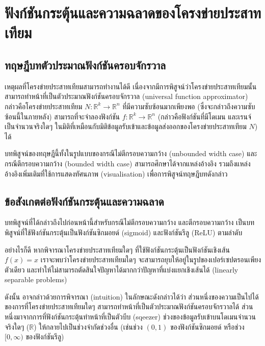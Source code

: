 \section{ฟังก์ชันกระตุ้นและความฉลาดของโครงข่ายประสาทเทียม}
\subsection{ทฤษฎีบทตัวประมาณฟังก์ชันครอบจักรวาล}
เหตุผลที่โครงข่ายประสาทเทียมสามารถทำงานได้ดี เนื่องจากมีการพิสูจน์ว่าโครงข่ายประสาทเทียมนั้นสามารถทำหน้าที่เป็นตัวประมาณฟังก์ชันครอบจักรวาล \cite{hornik_1991} (universal function approximator) กล่าวคือโครงข่ายประสาทเทียม $N: \mathbb{R} ^k \rightarrow \mathbb{R} ^n$ ที่มีความซับซ้อนมากเพียงพอ (ซึ่งจะกล่าวถึงความซับซ้อนนี้ในภายหลัง) สามารถที่จะจำลองฟังก์ชัน $f: \mathbb{R}^k \rightarrow \mathbb{R}^n$ (กล่าวคือฟังก์ชันที่มีโดเมน และเรนจ์ เป็นจำนวนจริงใดๆ ในมิติที่เหมือนกับมิติข้อมูลรับเข้าและข้อมูลส่งออกของโครงข่ายประสาทเทียม $N$) ได้ \cite{Cybenko1989} \cite{Leshno1993} \cite{1910.03344}

บทพิสูจน์ของทฤษฎีนี้ทั้งในรูปแบบของกรณีไม่ตีกรอบความกว้าง (unbounded width case) และกรณีตีกรอบความกว้าง (bounded width case) สามารถศึกษาได้จากแหล่งอ้างอิง รวมถึงแหล่งอ้างอิงเพิ่มเติมที่ใช้การแสดงทัศนภาพ (visualisation) เพื่อการพิสูจน์ทฤษฎีบทดังกล่าว \cite{nielsen_1970}

\subsection{ข้อสังเกตต่อฟังก์ชันกระตุ้นและความฉลาด}

บทพิสูจน์ที่ได้กล่าวถึงไปก่อนหน้านี้สำหรับกรณีไม่ตีกรอบความกว้าง และตีกรอบความกว้าง เป็นบทพิสูจน์ที่ใช้ฟังก์ชันกระตุ้นเป็นฟังก์ชันซิกมอยด์ (sigmoid) และฟังก์ชันรีลู (ReLU) ตามลำดับ

อย่างไรก็ดี หากพิจารณาโครงข่ายประสาทเทียมใดๆ ที่ใช้ฟังก์ชันกระตุ้นเป็นฟังก์ชันเชิงเส้น $f(x) = x$ เราจะพบว่าโครงข่ายประสาทเทียมใดๆ จะสามารถยุบให้อยู่ในรูปของเปอร์เซปตรอนเพียงตัวเดียว และทำให้ไม่สามารถตัดสินใจปัญหาได้มากกว่าปัญหาที่แบ่งแยกเชิงเส้นได้ (linearly separable problems)

ดังนั้น อาจกล่าวด้วยการพิจารณา (intuition) ในลักษณะดังกล่าวได้ว่า ส่วนหนึ่งของความเป็นไปได้ของการที่โครงข่ายประสาทเทียมใดๆ สามารถทำหน้าที่เป็นตัวประมาณฟังก์ชันครอบจักรวาลได้ ส่วนหนึ่งมาจากการที่ฟังก์ชันกระตุ้นทำหน้าที่เป็นตัวบีบ (sqeezer) ช่วงของข้อมูลรับเข้าบนโดเมนจำนวนจริงใดๆ ($\mathbb{R}$) ให้กลายไปเป็นช่วงจำกัดช่วงอื่น (เช่นช่วง $(0, 1)$ ของฟังก์ชันซิกมอยด์ หรือช่วง $[0, \infty)$ ของฟังก์ชันรีลู)


